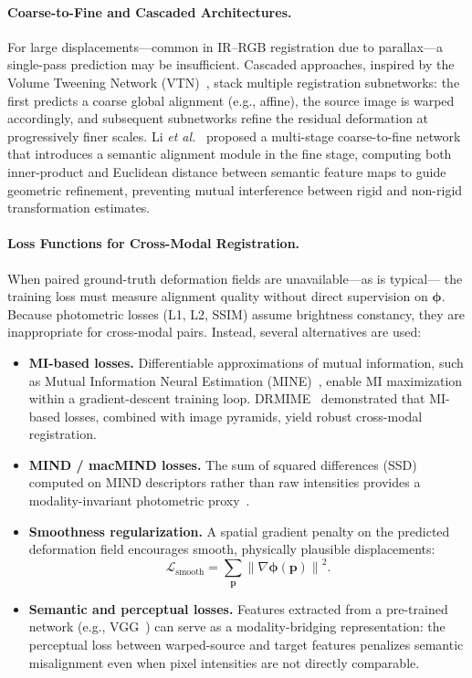 \paragraph{Coarse-to-Fine and Cascaded Architectures.}
For large displacements---common in IR--RGB registration due to parallax---a
single-pass prediction may be insufficient. Cascaded approaches, inspired by
the Volume Tweening Network (VTN)~\cite{zhao2019unsupervised}, stack multiple
registration subnetworks: the first predicts a coarse global alignment (e.g.,
affine), the source image is warped accordingly, and subsequent subnetworks
refine the residual deformation at progressively finer scales. Li
\textit{et al.}~\cite{li2025multistage} proposed a multi-stage coarse-to-fine
network that introduces a semantic alignment module in the fine stage,
computing both inner-product and Euclidean distance between semantic feature
maps to guide geometric refinement, preventing mutual interference between
rigid and non-rigid transformation estimates.

\paragraph{Loss Functions for Cross-Modal Registration.}
When paired ground-truth deformation fields are unavailable---as is typical---
the training loss must measure alignment quality without direct supervision on
$\boldsymbol{\phi}$. Because photometric losses (L1, L2, SSIM) assume
brightness constancy, they are inappropriate for cross-modal pairs. Instead,
several alternatives are used:

\begin{itemize}
  \item \textbf{MI-based losses.} Differentiable approximations of mutual
    information, such as Mutual Information Neural Estimation
    (MINE)~\cite{belghazi2018mutual}, enable MI maximization within a
    gradient-descent training loop. DRMIME~\cite{drmime2020} demonstrated that
    MI-based losses, combined with image pyramids, yield robust cross-modal
    registration.
  \item \textbf{MIND / macMIND losses.} The sum of squared differences (SSD)
    computed on MIND descriptors rather than raw intensities provides a
    modality-invariant photometric proxy~\cite{heinrich2012mind, macjnet2023}.
  \item \textbf{Smoothness regularization.} A spatial gradient penalty on the
    predicted deformation field encourages smooth, physically plausible
    displacements:
    \begin{equation}
      \mathcal{L}_{\mathrm{smooth}} = \sum_{\mathbf{p}} \left\|
        \nabla \boldsymbol{\phi}(\mathbf{p}) \right\|^2.
    \end{equation}
  \item \textbf{Semantic and perceptual losses.} Features extracted from a
    pre-trained network (e.g., VGG~\cite{simonyan2015very}) can serve as a
    modality-bridging representation: the perceptual loss between warped-source
    and target features penalizes semantic misalignment even when pixel
    intensities are not directly comparable.
\end{itemize}

